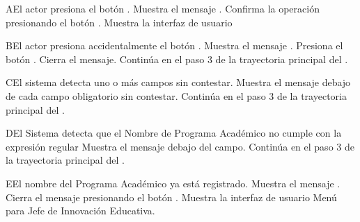 \begin{UCtrayectoriaA}{A}{El actor presiona el botón .}
    \UCpaso Muestra el mensaje .
    \UCpaso[\UCactor] Confirma la operación presionando el botón .
    \UCpaso Muestra la interfaz de usuario 
\end{UCtrayectoriaA}
\begin{UCtrayectoriaA}{B}{El actor presiona accidentalmente el botón .}
    \UCpaso Muestra el mensaje .
    \UCpaso[\UCactor] Presiona el botón .
    \UCpaso Cierra el mensaje.
    \UCpaso Continúa en el paso 3 de la trayectoria principal del .
\end{UCtrayectoriaA}
\begin{UCtrayectoriaA}{C}{El sistema detecta uno o más campos sin contestar.}
    \UCpaso Muestra el mensaje  debajo de cada campo obligatorio sin contestar.
    \UCpaso Continúa en el paso 3 de la trayectoria principal del .
\end{UCtrayectoriaA}
\begin{UCtrayectoriaA}{D}{El Sistema detecta que el Nombre de Programa Académico no cumple con la expresión regular}
    \UCpaso Muestra el mensaje  debajo del campo.
    \UCpaso Continúa en el paso 3 de la trayectoria principal del .
\end{UCtrayectoriaA}

\begin{UCtrayectoriaA}{E}{El nombre del Programa Académico ya está registrado.}
    \UCpaso Muestra el mensaje .
    \UCpaso[\UCactor] Cierra el mensaje presionando el botón .
\UCpaso Muestra la interfaz de usuario Menú para Jefe de Innovación Educativa.
\end{UCtrayectoriaA}

